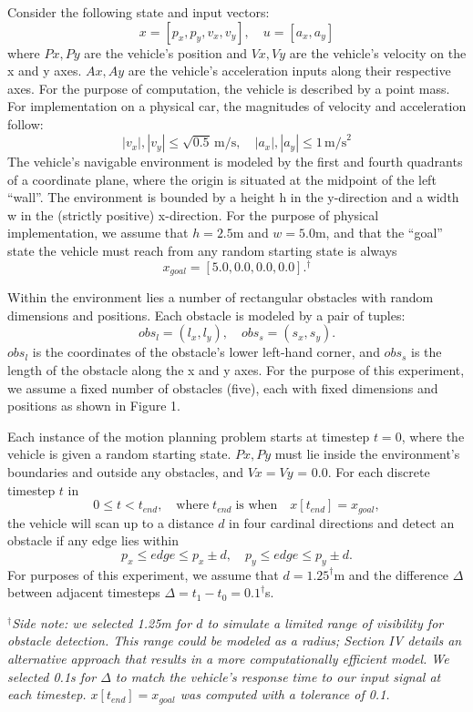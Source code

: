 \documentclass[
	letterpaper, %
	10pt, %
	unnumberedsections, %
	twoside, %
]{LTJournalArticle}
\begin{document}
\quad Consider the following state and input vectors:
\[x = [p_x, p_y, v_x, v_y], \quad u = [a_x, a_y]\]
\noindent where \(Px, Py\) are the vehicle’s position and \(Vx, Vy\) are the vehicle’s velocity on the x and y axes. \(Ax, Ay\) are the vehicle’s acceleration inputs along their respective axes. For the purpose of computation, the vehicle is described by a point mass. For implementation on a physical car, the magnitudes of velocity and acceleration follow:
\[
\left| v_x \right|, \left| v_y \right| \leq \sqrt{0.5} \, \text{m/s}, \quad \left| a_x \right|, \left| a_y \right| \leq 1 \, \text{m/s}^2
\]
\quad The vehicle’s navigable environment is modeled by the first and fourth quadrants of a coordinate plane, where the origin is situated at the midpoint of the left “wall”. The environment is bounded by a height h in the y-direction and a width w in the (strictly positive) x-direction. For the purpose of physical implementation, we assume that \(h = 2.5\)m and \(w = 5.0\)m, and that the “goal” state the vehicle must reach from any random starting state is always \[x_{goal} = [5.0, 0.0, 0.0, 0.0].^\dagger\]

Within the environment lies a number of rectangular obstacles with random dimensions and positions. Each obstacle is modeled by a pair of tuples:
\[obs_l = (l_x, l_y), \quad obs_s = (s_x, s_y).\]
\(obs_l\) is the coordinates of the obstacle’s lower left-hand corner, and \(obs_s\) is the length of the obstacle along the x and y axes. For the purpose of this experiment, we assume a fixed number of obstacles (five), each with fixed dimensions and positions as shown in Figure 1.

Each instance of the motion planning problem starts at timestep \(t=0\), where the vehicle is given a random starting state. \(Px, Py\) must lie inside the environment’s boundaries and outside any obstacles, and \(Vx = Vy\) = 0.0. For each discrete timestep \(t\) in
\[
0 \leq t < t_{end}, \quad \text{where}\; t_{end}\; \text{is when} \quad x[t_{end}] = x_{goal},
\]
the vehicle will scan up to a distance \(d\) in four cardinal directions and detect an obstacle if any edge lies within
\[
p_x \leq edge \leq p_x \pm d, \quad p_y \leq edge \leq p_y \pm d.
\]
 For purposes of this experiment, we assume that \(d = 1.25^\dagger\)m and the difference \(\Delta\) between adjacent timesteps \(\Delta = t_1 - t_0 = 0.1^\dagger\)s.

\textit{\(^\dagger\)Side note: we selected 1.25m for \(d\) to simulate a limited range of visibility for obstacle detection. This range could be modeled as a radius; Section IV details an alternative approach that results in a more computationally efficient model. We selected 0.1s for \(\Delta\) to match the vehicle's response time to our input signal at each timestep. \(x[t_{end}] = x_{goal}\) was computed with a tolerance of 0.1.}
\end{document}
